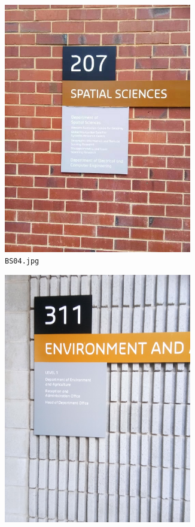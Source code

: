 \documentclass{article}
\begin{document}
\begin{figure}[h]
\begin{subfigure}[t]{0.22\textwidth}
    \includegraphics[width=0.9\textwidth]{../train/task1/BS04}
    \caption[BS04]{
      \lstinline{BS04.jpg}
    }
    \label{fig:bs04}
  \end{subfigure}
  \begin{subfigure}[t]{0.22\textwidth}
    \centering
    \includegraphics[width=0.9\textwidth]{../train/task1/BS09}

\end{subfigure}
\end{figure}
\end{document}
